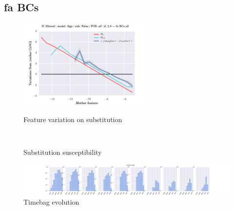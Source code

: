 \subsection{fa BCs}
\begin{figure}[h!]
    \centering
    \includegraphics[width=0.6\textwidth]{images/feature-cards/fa_BCs/feature_variations.png}
    \caption{Feature variation on substitution}
	~
	\caption{Substitution susceptibility}
    \includegraphics[width=\textwidth]{images/feature-cards/fa_BCs/timebags_evolution-hist.png}
	\caption{Timebag evolution}
\end{figure}


\clearpage
